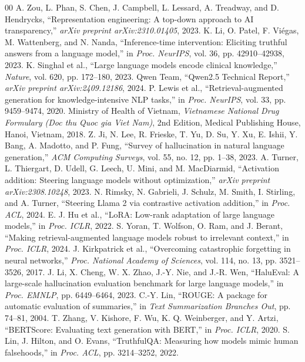 \documentclass[conference]{IEEEtran}
\begin{document}
\begin{thebibliography}{00}
 A. Zou, L. Phan, S. Chen, J. Campbell, L. Lessard, A. Treadway, and D. Hendrycks, ``Representation engineering: A top-down approach to AI transparency,'' \textit{arXiv preprint arXiv:2310.01405}, 2023.
 K. Li, O. Patel, F. Vi\'egas, M. Wattenberg, and N. Nanda, ``Inference-time intervention: Eliciting truthful answers from a language model,'' in \textit{Proc. NeurIPS}, vol. 36, pp. 42910--42938, 2023.
 K. Singhal et al., ``Large language models encode clinical knowledge,'' \textit{Nature}, vol. 620, pp. 172--180, 2023.
 Qwen Team, ``Qwen2.5 Technical Report,'' \textit{arXiv preprint arXiv:2409.12186}, 2024.
 P. Lewis et al., ``Retrieval-augmented generation for knowledge-intensive NLP tasks,'' in \textit{Proc. NeurIPS}, vol. 33, pp. 9459--9474, 2020.
 Ministry of Health of Vietnam, \textit{Vietnamese National Drug Formulary (Doc thu Quoc gia Viet Nam)}, 2nd Edition, Medical Publishing House, Hanoi, Vietnam, 2018.
 Z. Ji, N. Lee, R. Frieske, T. Yu, D. Su, Y. Xu, E. Ishii, Y. Bang, A. Madotto, and P. Fung, ``Survey of hallucination in natural language generation,'' \textit{ACM Computing Surveys}, vol. 55, no. 12, pp. 1--38, 2023.
 A. Turner, L. Thiergart, D. Udell, G. Leech, U. Mini, and M. MacDiarmid, ``Activation addition: Steering language models without optimization,'' \textit{arXiv preprint arXiv:2308.10248}, 2023.
 N. Rimsky, N. Gabrieli, J. Schulz, M. Smith, I. Stirling, and A. Turner, ``Steering Llama 2 via contrastive activation addition,'' in \textit{Proc. ACL}, 2024.
 E. J. Hu et al., ``LoRA: Low-rank adaptation of large language models,'' in \textit{Proc. ICLR}, 2022.
 S. Yoran, T. Wolfson, O. Ram, and J. Berant, ``Making retrieval-augmented language models robust to irrelevant context,'' in \textit{Proc. ICLR}, 2024.
 J. Kirkpatrick et al., ``Overcoming catastrophic forgetting in neural networks,'' \textit{Proc. National Academy of Sciences}, vol. 114, no. 13, pp. 3521--3526, 2017.
 J. Li, X. Cheng, W. X. Zhao, J.-Y. Nie, and J.-R. Wen, ``HaluEval: A large-scale hallucination evaluation benchmark for large language models,'' in \textit{Proc. EMNLP}, pp. 6449--6464, 2023.
 C.-Y. Lin, ``ROUGE: A package for automatic evaluation of summaries,'' in \textit{Text Summarization Branches Out}, pp. 74--81, 2004.
 T. Zhang, V. Kishore, F. Wu, K. Q. Weinberger, and Y. Artzi, ``BERTScore: Evaluating text generation with BERT,'' in \textit{Proc. ICLR}, 2020.
 S. Lin, J. Hilton, and O. Evans, ``TruthfulQA: Measuring how models mimic human falsehoods,'' in \textit{Proc. ACL}, pp. 3214--3252, 2022.
\end{thebibliography}
\end{document}
